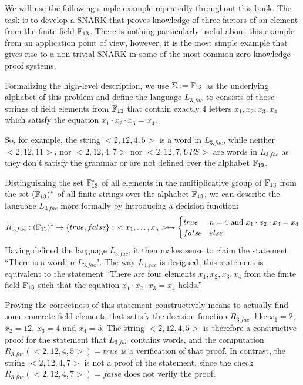 \begin{example}[3-Factorization]\label{ex:3-factorization} We will use the following simple example repeatedly throughout this book. The task is to develop a SNARK that proves knowledge of three factors of an element from the finite field $\mathbb{F}_{13}$. There is nothing particularly useful about this example from an application point of view, however, it is the most simple example that gives rise to a non-trivial SNARK in some of the most common zero-knowledge proof systems. 

Formalizing the high-level description, we use $\Sigma := \mathbb{F}_{13}$ as the underlying alphabet of this problem and define the language $L_{3.fac}$ to consists of those strings of field elements from $\mathbb{F}_{13}$ that contain exactly $4$ letters $x_1,x_2,x_3,x_4$ which satisfy the equation $x_1\cdot x_2\cdot x_3 =x_4$.

So, for example, the string $<2, 12, 4, 5>$ is a word in $L_{3.fac}$, while neither $<2, 12, 11>$, nor $<2, 12, 4, 7>$ nor $<2, 12, 7, UPS>$ are words in $L_{3.fac}$ as they don't satisfy the grammar or are not defined over the alphabet $\mathbb{F}_{13}$. 

Distinguishing the set $\mathbb{F}_{13}^*$ of all elements in the multiplicative group of $\mathbb{F}_{13}$ from the set $(\mathbb{F}_{13})^*$ of all finite strings over the alphabet $\mathbb{F}_{13}$, we can describe the language $L_{3.fac}$ more formally by introducing a decision function:
\begin{equation}
R_{3.fac} : (\mathbb{F}_{13})^* \to \{true, false\}\;;\;
<x_1,\ldots,x_n> \mapsto
\begin{cases}
true & n=4 \text{ and } x_1\cdot x_2 \cdot x_3 = x_4\\
false & else
\end{cases}
\end{equation}
Having defined the language $L_{3.fac}$, it then makes sense to claim the statement ``There is a word in $L_{3.fac}$". The way $L_{3.fac}$ is designed, this statement is equivalent to the statement ``There are four elements $x_1,x_2,x_3,x_4$ from the finite field $\mathbb{F}_{13}$ such that the equation $x_1\cdot x_2\cdot x_3 =x_4$ holds.''

Proving the correctness of this statement constructively means to actually find some concrete field elements that satisfy the decision function $R_{3.fac}$, like $x_1= 2$, $x_2 =12$, $x_3=4$ and $x_4 = 5$. The string $<2,12,4,5>$ is therefore a constructive proof for the statement that $L_{3.fac}$ contains words, and the computation $R_{3.fac}(<2,12,4,5>)=true$ is a verification of that proof. In contrast, the string $<2, 12, 4, 7>$ is not a proof of the statement, since the check $R_{3.fac}(<2,12,4,7>)=false$ does not verify the proof.
\end{example}
